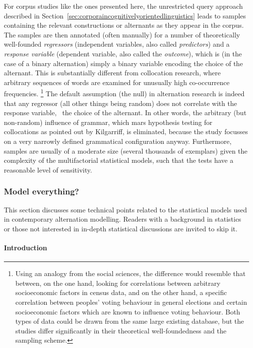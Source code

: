 For corpus studies like the ones presented here, the unrestricted query approach described in Section~\ref{sec:corporaincognitivelyorientedlinguistics} leads to samples containing the relevant constructions or alternants as they appear in the corpus.
The samples are then annotated (often manually) for a number of theoretically well-founded \textit{regressors} (independent variables, also called \textit{predictors}) and a \textit{response variable} (dependent variable, also called the \textit{outcome}), which is (in the case of a binary alternation) simply a binary variable encoding the choice of the alternant.
This is substantially different from collocation research, where arbitrary sequences of words are examined for unusually high co-occurrence frequencies.%
\footnote{Using an analogy from the social sciences, the difference would resemble that between, on the one hand, looking for correlations between arbitrary socioeconomic factors in census data, and on the other hand, a specific correlation between peoples' voting behaviour in general elections and certain socioeconomic factors which are known to influence voting behaviour.
Both types of data could be drawn from the same large existing database, but the studies differ significantly in their theoretical well-foundedness and the sampling scheme.}
The default assumption (the null) in alternation research is indeed that any regressor (all other things being random) does not correlate with the response variable, \ie\ the choice of the alternant.
In other words, the arbitrary (but non-random) influence of grammar, which mars hypothesis testing for collocations as pointed out by Kilgarriff, is eliminated, because the study focusses on a very narrowly defined grammatical configuration anyway.
Furthermore, samples are usually of a moderate size (several thousands of exemplars) given the complexity of the multifactorial statistical models, such that the tests have a reasonable level of sensitivity.

\subsubsection{Model everything?}
\label{sec:modeleverything}

This section discusses some technical points related to the statistical models used in contemporary alternation modelling.
Readers with a background in statistics or those not interested in in-depth statistical discussions are invited to skip it. 

\paragraph{Introduction}

